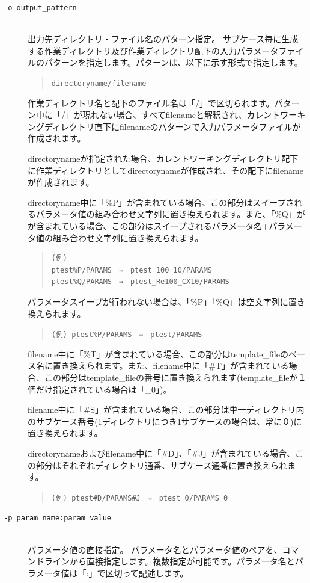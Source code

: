 \documentclass[a4paper,11pt]{jarticle}
\begin{document}
\begin{description}
\begin{description}
\item[{\tt -o  output\_pattern}] {\ }\\
出力先ディレクトリ・ファイル名のパターン指定。
サブケース毎に生成する作業ディレクトリ及び作業ディレクトリ配下の入力パラメータファイルのパターンを指定します。パターンは、以下に示す形式で指定します。
\begin{quote}
{\tt directoryname/filename}
\end{quote}
作業ディレクトリ名と配下のファイル名は「/」で区切られます。パターン中に「/」が現れない場合、すべてfilenameと解釈され、カレントワーキングディレクトリ直下にfilenameのパターンで入力パラメータファイルが作成されます。

directorynameが指定された場合、カレントワーキングディレクトリ配下に作業ディレクトリとしてdirectorynameが作成され、その配下にfilenameが作成されます。

directoryname中に「\%P」が含まれている場合、この部分はスイープされるパラメータ値の組み合わせ文字列に置き換えられます。また、「\%Q」がが含まれている場合、この部分はスイープされるパラメータ名+パラメータ値の組み合わせ文字列に置き換えられます。
\begin{quote}
\begin{verbatim}
(例)
ptest%P/PARAMS　⇒　ptest_100_10/PARAMS
ptest%Q/PARAMS　⇒　ptest_Re100_CX10/PARAMS
\end{verbatim}
\end{quote}

パラメータスイープが行われない場合は、「\%P」「\%Q」は空文字列に置き換えられます。
\begin{quote}
{\tt (例) ptest\%P/PARAMS　⇒　ptest/PARAMS}
\end{quote}

filename中に「\%T」が含まれている場合、この部分はtemplate\_fileのベース名に置き換えられます。また、filename中に「\#T」が含まれている場合、この部分はtemplate\_fileの番号に置き換えられます(template\_fileが１個だけ指定されている場合は「\_0」)。

filename中に「\#S」が含まれている場合、この部分は単一ディレクトリ内のサブケース番号(1ディレクトリにつき1サブケースの場合は、常に０)に置き換えられます。

directorynameおよびfilename中に「\#D」、「\#J」が含まれている場合、この部分はそれぞれディレクトリ通番、サブケース通番に置き換えられます。
\begin{quote}
{\tt (例) ptest\#D/PARAMS\#J　⇒　ptest\_0/PARAMS\_0}
\end{quote}

\item[{\tt -p param\_name:param\_value}] {\ }\\
パラメータ値の直接指定。
パラメータ名とパラメータ値のペアを、コマンドラインから直接指定します。複数指定が可能です。パラメータ名とパラメータ値は「:」で区切って記述します。


\end{description}
\end{description}
\end{document}
